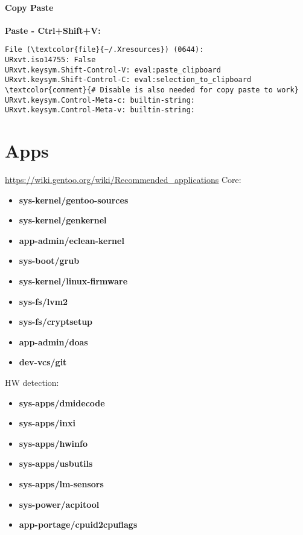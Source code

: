\documentclass[10pt, a4paper, onecolumn, openany]{book}         %
\begin{document}
\subsubsection{Copy Paste}
\textbf{Paste - Ctrl+Shift+V:}

\begin{Verbatim}[commandchars=\\\{\}]
File (\textcolor{file}{~/.Xresources}) (0644):
URxvt.iso14755: False
URxvt.keysym.Shift-Control-V: eval:paste_clipboard
URxvt.keysym.Shift-Control-C: eval:selection_to_clipboard
\textcolor{comment}{# Disable is also needed for copy paste to work}
URxvt.keysym.Control-Meta-c: builtin-string:
URxvt.keysym.Control-Meta-v: builtin-string:
\end{Verbatim}



\chapter{Apps}
\underline{\url{https://wiki.gentoo.org/wiki/Recommended_applications}}\newline
Core:
\begin{itemize}
    \item \textbf{sys-kernel/gentoo-sources}
    \item \textbf{sys-kernel/genkernel}
    \item \textbf{app-admin/eclean-kernel}
    \item \textbf{sys-boot/grub}
    \item \textbf{sys-kernel/linux-firmware}
    \item \textbf{sys-fs/lvm2}
    \item \textbf{sys-fs/cryptsetup}
    \item \textbf{app-admin/doas}
    \item \textbf{dev-vcs/git}
\end{itemize}
HW detection:
\begin{itemize}
    \item \textbf{sys-apps/dmidecode}
    \item \textbf{sys-apps/inxi}
    \item \textbf{sys-apps/hwinfo}
    \item \textbf{sys-apps/usbutils}
    \item \textbf{sys-apps/lm-sensors}
    \item \textbf{sys-power/acpitool}
    \item \textbf{app-portage/cpuid2cpuflags}
\end{itemize}
\end{document}

